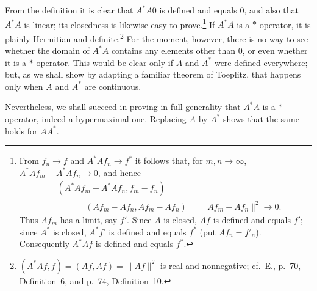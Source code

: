 \documentclass[fontsize=13pt,paper=b5,leqno,bookmarkpackage=false]{scrartcl}
\begin{document}
From the definition it is clear that \(A^*A0\) is defined and equals
\(0\), and also that \(A^*A\) is linear; its closedness is likewise easy
to prove.\footnote{\label{fn:9}%
From \(f_n\to f\) and \(A^*Af_n\to f^*\) it follows that, for
\(m,n\to\infty\), \(A^*Af_m-A^*Af_n\to0\), and hence
\[
 \begin{aligned}
 &(A^*Af_m-A^*Af_n,f_m-f_n)\\
 &\qquad=(Af_m-Af_n,Af_m-Af_n)
 =\lVert Af_m-Af_n\rVert^2\longrightarrow0 .
 \end{aligned}
\]
Thus \(Af_m\) has a limit, say \(f'\). Since \(A\) is closed, \(Af\) is
defined and equals \(f'\); since \(A^*\) is closed, \(A^*f'\) is defined
and equals \(f^*\) (put \(Af_n=f'_n\)). Consequently \(A^*Af\) is
defined and equals \(f^*\).}
If \(A^*A\) is a \(*\)-operator, it is plainly Hermitian and
definite.\footnote{\label{fn:10}%
\((A^*Af,f)=(Af,Af)=\lVert Af\rVert^2\) is real and nonnegative;
cf.\ \hyperlink{bib:E}{E.}, p.~70, Definition~6, and p.~74,
Definition~10.}
For the moment, however, there is no way to see whether the domain of
\(A^*A\) contains any elements other than \(0\), or even whether it is a
\(*\)-operator. This would be clear only if \(A\) and \(A^*\) were
defined everywhere; but, as we shall show by adapting a familiar
theorem of Toeplitz, that happens only when \(A\) and \(A^*\) are
continuous.

Nevertheless, we shall succeed in proving in full generality that
\(A^*A\) is a \(*\)-operator, indeed a hypermaximal one. Replacing \(A\)
by \(A^*\) shows that the same holds for \(AA^*\).
\end{document}
